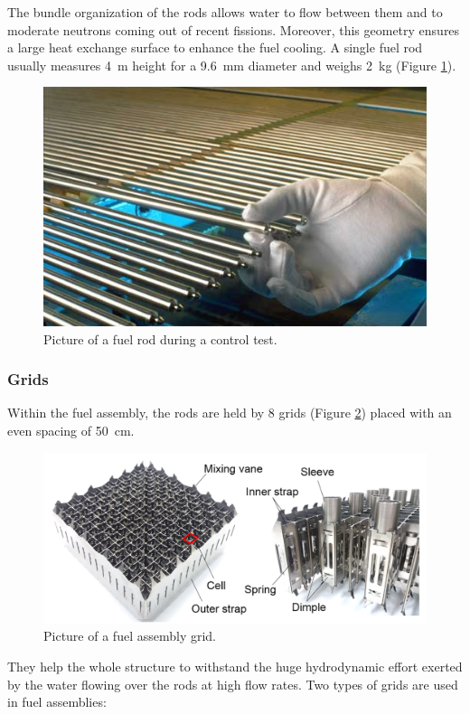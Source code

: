 \npar

The bundle organization of the rods allows water to flow between them and to moderate neutrons coming out of recent fissions. Moreover, this geometry ensures a large heat exchange surface to enhance the fuel cooling. A single fuel rod usually measures 4\ m height for a 9.6\ mm diameter and weighs 2\ kg (Figure \ref{fig:fuel_rod}).


\begin{figure}[!h]
\centering
\includegraphics[width=0.6\linewidth]{img/intro/fuel_rod.jpg}
\caption{Picture of a fuel rod during a control test. \cite{kamin_cycle_2019}}
\label{fig:fuel_rod}
\end{figure}

\npar
 
\subsubsection{Grids}

Within the fuel assembly, the rods are held by 8 grids (Figure \ref{fig:fuel_grid}) placed with an even spacing of 50\ cm. 

\begin{figure}[!h]
\centering
\includegraphics[width=0.8\linewidth]{img/intro/pic_grid.png}
\caption{Picture of a fuel assembly grid. \cite{yoo_finite_2019}}
\label{fig:fuel_grid}
\end{figure}

\npar


They help the whole structure to withstand the huge hydrodynamic effort exerted by the water flowing over the rods
at high flow rates. Two types of grids are used in fuel assemblies:

